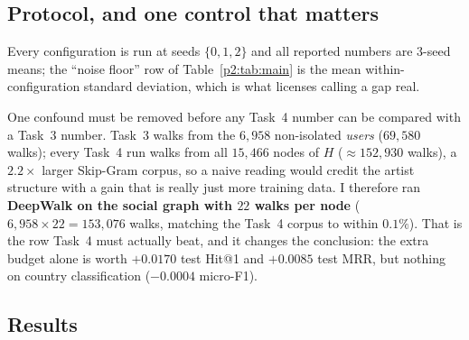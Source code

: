 \subsection{Protocol, and one control that matters}
\label{p2:sec:protocol}

Every configuration is run at seeds $\{0,1,2\}$ and all reported numbers are $3$-seed
means; the ``noise floor'' row of Table~\ref{p2:tab:main} is the mean within-configuration
standard deviation, which is what licenses calling a gap real.

One confound must be removed before any Task~4 number can be compared with a Task~3
number.  Task~3 walks from the $6{,}958$ non-isolated \emph{users} ($69{,}580$ walks);
every Task~4 run walks from all $15{,}466$ nodes of $H$ ($\approx\!152{,}930$ walks), a
$2.2\times$ larger Skip-Gram corpus, so a naive reading would credit the artist structure
with a gain that is really just more training data.  I therefore ran \textbf{DeepWalk on
the social graph with $22$ walks per node} ($6{,}958\times22 = 153{,}076$ walks, matching
the Task~4 corpus to within $0.1\%$).  That is the row Task~4 must actually beat, and it
changes the conclusion: the extra budget alone is worth $+0.0170$ test Hit@1 and
$+0.0085$ test MRR, but nothing on country classification ($-0.0004$ micro-F1).

\subsection{Results}
\label{p2:sec:results}

